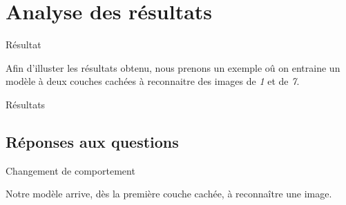 \documentclass[10pt,handout]{beamer}
\newif\ifplacelogo %
\begin{document}
\section{Analyse des résultats}
\begin{frame}{Résultat}
    \begin{block}{}
        Afin d'illuster les résultats obtenu, nous prenons un exemple oû on entraine un modèle à deux couches cachées à reconnaitre des images de \textit{1} et de \textit{7}.
    \end{block}
\end{frame}

\placelogofalse
\begin{frame}{Résultats}
\end{frame}
\placelogotrue

\subsection{Réponses aux questions}
\begin{frame}{Changement de comportement}
    \begin{block}{}
        Notre modèle arrive, dès la première couche cachée, à reconnaître une image.
    \end{block}
    
\end{frame}
\end{document}
